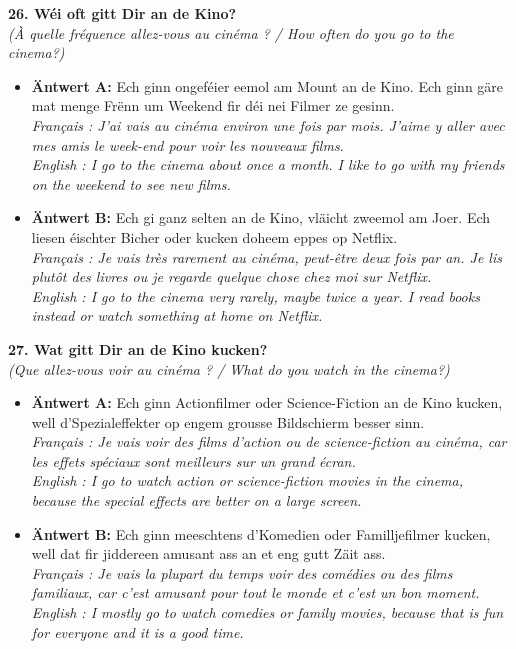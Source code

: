 \noindent\textbf{26. Wéi oft gitt Dir an de Kino?}\\
\textit{(À quelle fréquence allez-vous au cinéma ? / How often do you go to the cinema?)}
\begin{itemize}
    \item \textbf{Äntwert A:} Ech ginn ongeféier eemol am Mount an de Kino. Ech ginn gäre mat menge Frënn um Weekend fir déi nei Filmer ze gesinn.\\
    \textit{Français : J'ai vais au cinéma environ une fois par mois. J'aime y aller avec mes amis le week-end pour voir les nouveaux films.}\\
    \textit{English : I go to the cinema about once a month. I like to go with my friends on the weekend to see new films.}
    \item \textbf{Äntwert B:} Ech gi ganz selten an de Kino, vläicht zweemol am Joer. Ech liesen éischter Bicher oder kucken doheem eppes op Netflix.\\
    \textit{Français : Je vais très rarement au cinéma, peut-être deux fois par an. Je lis plutôt des livres ou je regarde quelque chose chez moi sur Netflix.}\\
    \textit{English : I go to the cinema very rarely, maybe twice a year. I read books instead or watch something at home on Netflix.}
\end{itemize}
\vspace{0.5em}

\noindent\textbf{27. Wat gitt Dir an de Kino kucken?}\\
\textit{(Que allez-vous voir au cinéma ? / What do you watch in the cinema?)}
\begin{itemize}
    \item \textbf{Äntwert A:} Ech ginn Actionfilmer oder Science-Fiction an de Kino kucken, well d'Spezialeffekter op engem grousse Bildschierm besser sinn.\\
    \textit{Français : Je vais voir des films d'action ou de science-fiction au cinéma, car les effets spéciaux sont meilleurs sur un grand écran.}\\
    \textit{English : I go to watch action or science-fiction movies in the cinema, because the special effects are better on a large screen.}
    \item \textbf{Äntwert B:} Ech ginn meeschtens d'Komedien oder Familljefilmer kucken, well dat fir jiddereen amusant ass an et eng gutt Zäit ass.\\
    \textit{Français : Je vais la plupart du temps voir des comédies ou des films familiaux, car c'est amusant pour tout le monde et c'est un bon moment.}\\
    \textit{English : I mostly go to watch comedies or family movies, because that is fun for everyone and it is a good time.}
\end{itemize}
\vspace{0.5em}


